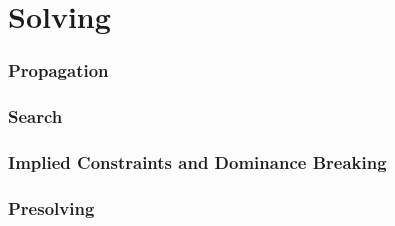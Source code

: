 


\section{Solving}




\subsubsection{Propagation}




\subsubsection{Search}




\subsubsection{Implied Constraints and Dominance Breaking}




\subsubsection{Presolving}

